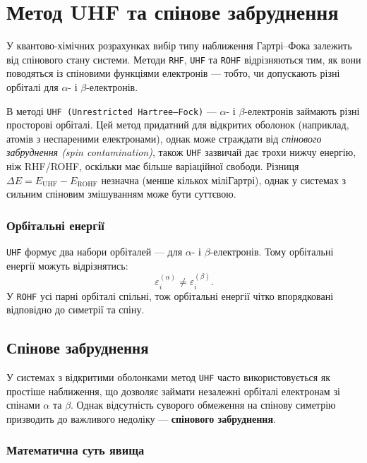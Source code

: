 \section{Метод UHF та спінове забруднення}

У квантово-хімічних розрахунках вибір типу наближення Гартрі–Фока залежить від спінового стану системи.
Методи \texttt{RHF}, \texttt{UHF} та \texttt{ROHF} відрізняються тим, як вони поводяться із спіновими функціями електронів — тобто, чи допускають різні орбіталі для $\alpha$- і $\beta$-електронів.

В методі \texttt{UHF (Unrestricted Hartree–Fock)} --- $\alpha$- і $\beta$-електронів займають різні просторові орбіталі.
Цей метод придатний для відкритих оболонок (наприклад, атомів з неспареними електронами), однак може страждати від \emph{спінового забруднення (spin contamination)}, також \texttt{UHF} зазвичай дає трохи нижчу енергію, ніж RHF/ROHF, оскільки має більше варіаційної свободи.
Різниця $\Delta E = E_{\mathrm{UHF}} - E_{\mathrm{ROHF}}$ незначна (менше кількох міліГартрі), однак у системах з сильним спіновим змішуванням може бути суттєвою.

\subsubsection{Орбітальні енергії}

\texttt{UHF} формує два набори орбіталей --- для $\alpha$- і $\beta$-електронів.
Тому орбітальні енергії можуть відрізнятись:
\[
\varepsilon_i^{(\alpha)} \neq \varepsilon_i^{(\beta)}.
\]
У \texttt{ROHF} усі парні орбіталі спільні, тож орбітальні енергії чітко впорядковані відповідно до симетрії та спіну.

\subsection{Спінове забруднення}

У системах з відкритими оболонками метод \texttt{UHF} часто використовується як простіше наближення, що дозволяє займати незалежні орбіталі електронам зі спінами $\alpha$ та $\beta$.
Однак відсутність суворого обмеження на спінову симетрію призводить до важливого недоліку --- \textbf{спінового забруднення}.


\subsubsection*{Математична суть явища}

